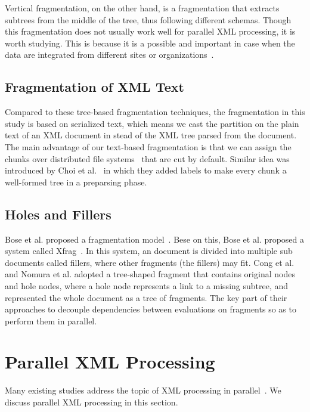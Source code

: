 Vertical fragmentation, on the other hand, is a fragmentation that extracts
subtrees from the middle of the tree, thus following different schemas. Though
this fragmentation does not usually work well for parallel XML processing, it is
worth studying. This is because it is a possible and  important in case when the
data are integrated from different sites or organizations~\cite{CFKL12,KlOD10}.

\subsection{Fragmentation of XML Text}

Compared to these tree-based fragmentation techniques, the fragmentation in this
study is based on serialized text, which means we cast the partition on the
plain text of an XML document in stead of the XML tree parsed from the document.
The main advantage of our text-based fragmentation is that we can assign the
chunks over distributed file systems~\cite{dfs} that are cut by default. Similar
idea was introduced by Choi et al.~\cite{ChLL14} in which they added labels to
make every chunk a well-formed tree in a preparsing phase.

\subsection{Holes and Fillers}

Bose et al. proposed a fragmentation model~\cite{bose2003query}. Bese on this,
Bose  et al. proposed a system called Xfrag~\cite{bose2005xfrag}. In this
system, an document is divided into multiple sub documents called fillers,
where other fragments (the fillers) may fit.  Cong et al.~\cite{CFKL12} and
Nomura et al. \cite{NEMH07} adopted a tree-shaped fragment that contains
original nodes and hole nodes, where a hole node represents a link to a missing
subtree, and represented the whole document as a tree of fragments. The key part
of their approaches to decouple dependencies between evaluations on fragments so
as to perform them in parallel.


\section{Parallel XML Processing}
\label{sec:paralleleval}

Many existing studies address the topic of XML processing in
parallel~\cite{BoLS09,PaZC08,LuGa08,Mats09,SAFu05}. We discuss parallel XML
processing in this section.

